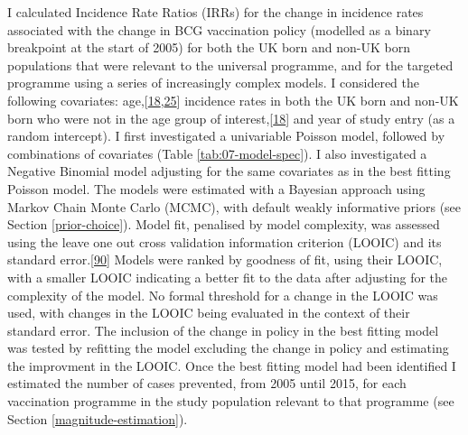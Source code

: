 \documentclass[11pt,twoside]{bristolthesis}
\begin{document}
  I calculated Incidence Rate Ratios (IRRs) for the change in incidence rates associated with the change in BCG vaccination policy (modelled as a binary breakpoint at the start of 2005) for both the UK born and non-UK born populations that were relevant to the universal programme, and for the targeted programme using a series of increasingly complex models. I considered the following covariates: age,{[}\protect\hyperlink{ref-PHE2016a}{18},\protect\hyperlink{ref-Zwerling2011}{25}{]} incidence rates in both the UK born and non-UK born who were not in the age group of interest,{[}\protect\hyperlink{ref-PHE2016a}{18}{]} and year of study entry (as a random intercept). I first investigated a univariable Poisson model, followed by combinations of covariates (Table \ref{tab:07-model-spec}). I also investigated a Negative Binomial model adjusting for the same covariates as in the best fitting Poisson model. The models were estimated with a Bayesian approach using Markov Chain Monte Carlo (MCMC), with default weakly informative priors (see Section \ref{prior-choice}). Model fit, penalised by model complexity, was assessed using the leave one out cross validation information criterion (LOOIC) and its standard error.{[}\protect\hyperlink{ref-Vehtari2016}{90}{]} Models were ranked by goodness of fit, using their LOOIC, with a smaller LOOIC indicating a better fit to the data after adjusting for the complexity of the model. No formal threshold for a change in the LOOIC was used, with changes in the LOOIC being evaluated in the context of their standard error. The inclusion of the change in policy in the best fitting model was tested by refitting the model excluding the change in policy and estimating the improvment in the LOOIC. Once the best fitting model had been identified I estimated the number of cases prevented, from 2005 until 2015, for each vaccination programme in the study population relevant to that programme (see Section \ref{magnitude-estimation}).
\end{document}
